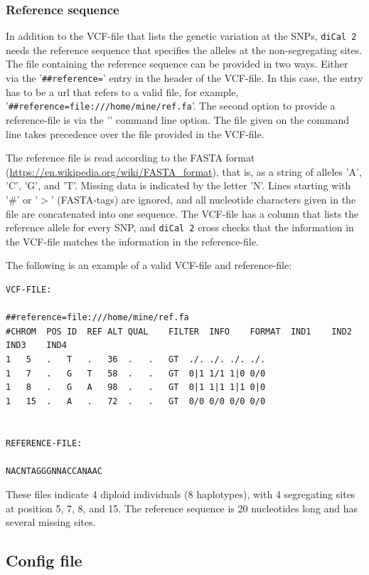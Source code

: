 \documentclass{article}
\numberwithin{equation}{section}
\begin{document}
\subsubsection{Reference sequence}
\label{sec_reference}

In addition to the VCF-file that lists the genetic variation at the SNPs, \texttt{diCal 2} needs the reference sequence that specifies the alleles at the non-segregating sites. The file containing the reference sequence can be provided in two ways. Either via the '\texttt{\#\#reference=}' entry in the header of the VCF-file. In this case, the entry has to be a url that refers to a valid file, for example, '\texttt{\#\#reference=file:///home/mine/ref.fa}'. The second option to provide a reference-file is via the '\texttt{}' command line option. The file given on the command line takes precedence over the file provided in the VCF-file.

The reference file is read according to the FASTA format (\url{https://en.wikipedia.org/wiki/FASTA\_format}), that is, as a string of alleles 'A', 'C', 'G', and 'T'. Missing data is indicated by the letter 'N'. Lines starting with '\#' or '$>$' (FASTA-tags) are ignored, and all nucleotide characters given in the file are concatenated into one sequence. The VCF-file has a column that lists the reference allele for every SNP, and \texttt{diCal 2} cross checks that the information in the VCF-file matches the information in the reference-file.

The following is an example of a valid VCF-file and reference-file:
\begin{verbatim}
VCF-FILE:

##reference=file:///home/mine/ref.fa
#CHROM	POS	ID	REF	ALT	QUAL	FILTER	INFO	FORMAT	IND1	IND2	IND3	IND4
1	5	.	T	.	36	.	.	GT	./.	./.	./.	./.
1	7	.	G	T	58	.	.	GT	0|1	1/1	1|0	0/0
1	8	.	G	A	98	.	.	GT	0|1	1|1	1|1	0|0
1	15	.	A	.	72	.	.	GT	0/0	0/0	0/0	0/0


REFERENCE-FILE:

NACNTAGGGNNACCANAAC
\end{verbatim}
These files indicate 4 diploid individuals (8 haplotypes), with 4 segregating sites at position 5, 7, 8, and 15. The reference sequence is 20 nucleotides long and has several missing sites.

\subsection{Config file}
\label{sec_config}
\end{document}
